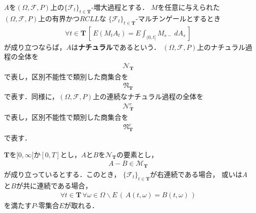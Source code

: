 	\begin{screen}
		\begin{dfn}[ナチュラル]
			$A$を$(\Omega,\mathscr{F},P)$上の$\{\mathscr{F}_t\}_{t \in \mathbf{T}}$-増大過程とする．
			$M$を任意に与えられた$(\Omega,\mathscr{F},P)$上の有界かつ$RCLL$な
			$\{\mathscr{F}_t\}_{t \in \mathbf{T}}$-マルチンゲールとするとき
			\begin{align}
				\forall t \in \mathbf{T}\, 
				\left[\, E(M_t A_t) = E \int_{(0,t]} M_{s-}\ dA_s\, \right]
			\end{align}
			が成り立つならば，$A$は{\bf ナチュラル}であるという．
			$(\Omega,\mathscr{F},P)$上のナチュラル過程の全体を
			\begin{align}
				\mathscr{N}_{\mathbf{T}}
			\end{align}
			で表し，区別不能性で類別した商集合を
			\begin{align}
				\mathfrak{N}_{\mathbf{T}}
			\end{align}
			で表す．同様に，$(\Omega,\mathscr{F},P)$上の連続なナチュラル過程の全体を
			\begin{align}
				\mathscr{N}^c_{\mathbf{T}}
			\end{align}
			で表し，区別不能性で類別した商集合を
			\begin{align}
				\mathfrak{N}^c_{\mathbf{T}}
			\end{align}
			で表す．
		\end{dfn}
	\end{screen}
	
	\begin{screen}
		\begin{thm}[連続な増大過程はナチュラル]
		\end{thm}
	\end{screen}
	
	\begin{screen}
		\begin{thm}[有界変動なマルチンゲールは殆ど全てのパスが定値]
		\label{thm:martingale_with_bounded_variation_is_constant}
			$\mathbf{T}$を$[0,\infty[$か$[0,T]$とし，$A$と$B$を$\mathscr{N}_{\mathbf{T}}$の要素とし，
			\begin{align}
				A - B \in \mathscr{M}_{\mathbf{T}}
			\end{align}
			が成り立っているとする．このとき，
			$\{\mathscr{F}_t\}_{t \in \mathbf{T}}$が右連続である場合，
			或いは$A$と$B$が共に連続である場合，
			\begin{align}
				\forall t \in \mathbf{T}\, \forall \omega \in \Omega \backslash E\,
				\left(\, A(t,\omega) = B(t,\omega)\, \right)
			\end{align}
			を満たす$P$-零集合$E$が取れる．
		\end{thm}
	\end{screen}
	

